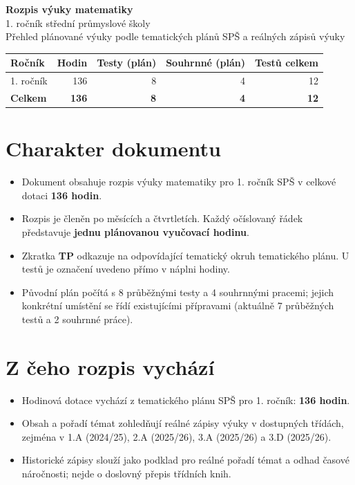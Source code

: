 \documentclass[10pt,a4paper]{article}
\begin{document}
\begin{center}
{\LARGE\bfseries Rozpis výuky matematiky}\\[3mm]
{\large 1. ročník střední průmyslové školy}\\[3mm]
{\small Přehled plánované výuky podle tematických plánů SP\v{S} a reálných zápisů výuky}
\end{center}
\vspace{3mm}
\begin{tabularx}{\textwidth}{@{}Xrrrr@{}}\toprule
\textbf{Ročník} & \textbf{Hodin} & \textbf{Testy (plán)} & \textbf{Souhrnné (plán)} & \textbf{Testů celkem}\\\midrule
1. ročník & 136 & 8 & 4 & 12\\\midrule
\textbf{Celkem} & \textbf{136} & \textbf{8} & \textbf{4} & \textbf{12}\\\bottomrule
\end{tabularx}
\vspace{4mm}
\section*{Charakter dokumentu}
\begin{itemize}\setlength{\itemsep}{2pt}
\item Dokument obsahuje rozpis výuky matematiky pro 1. ročník SP\v{S} v celkové dotaci \textbf{136 hodin}.
\item Rozpis je členěn po měsících a čtvrtletích. Každý očíslovaný řádek představuje \textbf{jednu plánovanou vyučovací hodinu}.
\item Zkratka \textbf{TP} odkazuje na odpovídající tematický okruh tematického plánu. U testů je označení uvedeno přímo v náplni hodiny.
\item Původní plán počítá s 8 průběžnými testy a 4 souhrnnými pracemi; jejich konkrétní umístění se řídí existujícími přípravami (aktuálně 7 průběžných testů a 2 souhrnné práce).
\end{itemize}

\section*{Z čeho rozpis vychází}
\begin{itemize}\setlength{\itemsep}{2pt}
\item Hodinová dotace vychází z tematického plánu SP\v{S} pro 1. ročník: \textbf{136 hodin}.
\item Obsah a pořadí témat zohledňují reálné zápisy výuky v dostupných třídách, zejména v 1.A (2024/25), 2.A (2025/26), 3.A (2025/26) a 3.D (2025/26).
\item Historické zápisy slouží jako podklad pro reálné pořadí témat a odhad časové náročnosti; nejde o doslovný přepis třídních knih.
\end{itemize}
\end{document}

